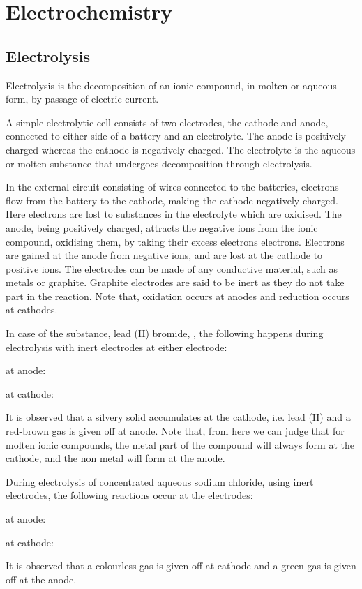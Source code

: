 \section{Electrochemistry}
\subsection{Electrolysis}

Electrolysis is the decomposition of an ionic compound, in molten or aqueous form, by passage
of electric current.

A simple electrolytic cell consists of two electrodes, the cathode and anode, connected to either
side of a battery and an electrolyte. The anode is positively charged whereas the cathode is
negatively charged. The electrolyte is the aqueous or molten substance that undergoes decomposition
through electrolysis.

In the external circuit consisting of wires connected to the batteries, electrons flow from the
battery to the cathode, making the cathode negatively charged. Here electrons are lost to 
substances in the electrolyte which are oxidised. The anode, being positively charged, attracts
the negative ions from the ionic compound, oxidising them, by taking their
excess electrons electrons. Electrons are
gained at the anode from negative ions, and are lost at the cathode to positive ions. The 
electrodes can be made of any conductive material, such as metals or graphite. Graphite electrodes
are said to be inert as they do not take part in the reaction. Note that, oxidation occurs at
anodes and reduction occurs at cathodes.

In case of the substance, lead (II) bromide, , the following happens 
during electrolysis with inert electrodes
at either electrode:

\begin{center}
at anode: 

at cathode: 
\end{center}

It is observed that a silvery solid accumulates at the cathode, i.e. lead (II) and a red-brown
gas is given off at anode. Note that, from here we can judge that for molten ionic compounds, the
metal part of the compound will always form at the cathode, and the non metal will form at the
anode.

During electrolysis of concentrated aqueous sodium chloride, using inert electrodes, the following
reactions occur at the electrodes:
\begin{center}
	at anode: 

	at cathode: 
\end{center}
It is observed that a colourless gas is given off at cathode and a green gas is given off at the
anode.

